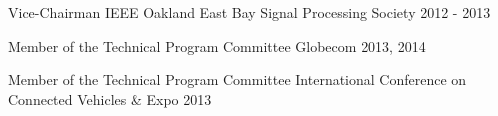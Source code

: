

\begin{cvhonors}

  \cvhonor
    {Vice-Chairman} %
    {IEEE Oakland East Bay Signal Processing Society} %
    {} %
    {2012 - 2013} %

  \cvhonor
    {Member of the Technical Program Committee} %
    {Globecom} %
    {} %
    {2013, 2014} %

  \cvhonor
    {Member of the Technical Program Committee} %
    {International Conference on Connected Vehicles \& Expo} %
    {} %
    {2013} %

\end{cvhonors}
